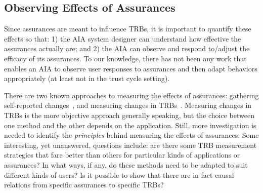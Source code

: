 \subsection{Observing Effects of Assurances} \label{sec:measuring_effects}
    Since assurances are meant to influence TRBs, it is important to quantify these effects so that:  1) the AIA system designer can understand how effective the assurances actually are; and 2) the AIA can observe and respond to/adjust the efficacy of its assurances. 
    To our knowledge, there has not been any work that enables an AIA to observe user responses to assurances and then adapt behaviors appropriately (at least not in the trust cycle setting). 

    There are two known approaches to measuring the effects of assurances: gathering self-reported changes~\cite{Mcknight2011-gv,Muir1996-gt,Wickens1999-la,Salem2015-md,Kaniarasu2013-ho}, and measuring changes in TRBs~\cite{Freedy2007-sg,Desai2012-rc,Salem2015-md,Wu2016-ei,Bainbridge2011-pl}. Measuring changes in TRBs is the more objective approach generally speaking, but the choice between one method and the other depends on the application. Still, more investigation is needed to identify the \emph{principles} behind measuring the effects of assurances. Some interesting, yet unanswered, questions include: are there some TRB measurement strategies that fare better than others for particular kinds of applications or assurances? In what ways, if any, do these methods need to be adapted to suit different kinds of users? Is it possible to show that there are in fact causal relations from specific assurances to specific TRBs? 